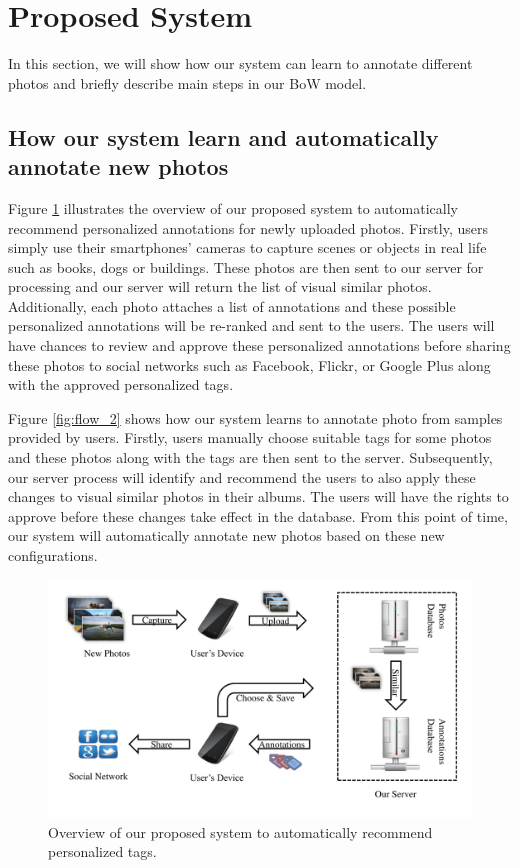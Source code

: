 \section{Proposed System} \label{section:proposed_system}

In this section, we will show how our system can learn to annotate different photos and briefly describe main steps in our BoW model.

\subsection {How our system learn and automatically annotate new photos} \label{section:main_flow}

Figure \ref{fig:flow_1} illustrates the overview of our proposed system to automatically recommend personalized annotations for newly uploaded photos. Firstly, users simply use their smartphones’ cameras to capture scenes or objects in real life such as books, dogs or buildings. These photos are then sent to our server for processing and our server will return the list of visual similar photos. Additionally, each photo attaches a list of annotations and these possible personalized annotations will be re-ranked and sent to the users. The users will have chances to review and approve these personalized annotations before sharing these photos to social networks such as Facebook, Flickr, or Google Plus along with the approved personalized tags.

Figure \ref{fig:flow_2} shows how our system learns to annotate photo from samples provided by users. Firstly, users manually choose suitable tags for some photos and these photos along with the tags are then sent to the server. Subsequently, our server process will identify and recommend the users to also apply these changes to visual similar photos in their albums. The users will have the rights to approve before these changes take effect in the database. From this point of time, our system will automatically annotate new photos based on these new configurations.

\begin{figure}
    \centering
    \includegraphics[width=5.0in]{flow1.pdf}
    \caption{Overview of our proposed system to automatically recommend personalized tags.}
    \label{fig:flow_1}
\end{figure}

